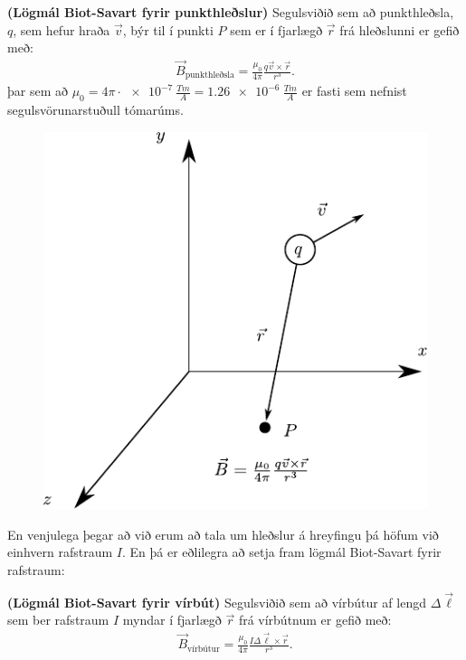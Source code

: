 \ifdefined \wholebook \else\documentclass[oneside]{book}\usepackage{EdlBook}\graphicspath{{figures/}}
\begin{document}
\begin{tcolorbox}
\begin{theorem}
\textbf{(Lögmál Biot-Savart fyrir punkthleðslur)} Segulsviðið sem að punkthleðsla, $q$, sem hefur hraða $\Vec{v}$, býr til í punkti $P$ sem er í fjarlægð $\Vec{r}$ frá hleðslunni er gefið með:
\begin{align*}
    \Vec{B}_{\text{punkthleðsla}} = \frac{\mu_0}{4\pi} \frac{q\Vec{v} \times \Vec{r}}{r^3}.
\end{align*}
þar sem að $\mu_0 = 4\pi  \cdot \SI{e-7}{\frac{Tm}{A}} = \SI{1.26e-6}{\frac{Tm}{A}}$ er fasti sem nefnist segulsvörunarstuðull tómarúms.
\end{theorem}
\end{tcolorbox}
\begin{figure}[H]
    \centering
    \includegraphics[scale = 1]{figures/segulsvidid.pdf}
\end{figure}
En venjulega þegar að við erum að tala um hleðslur á hreyfingu þá höfum við einhvern rafstraum $I$. En þá er eðlilegra að setja fram lögmál Biot-Savart fyrir rafstraum:
\begin{tcolorbox}
\begin{theorem}
\textbf{(Lögmál Biot-Savart fyrir vírbút)} Segulsviðið sem að vírbútur af lengd $\Delta \vec{\ell}$ sem ber rafstraum $I$ myndar í fjarlægð $\vec{r}$ frá vírbútnum er gefið með:
\begin{align*}
    \Vec{B}_{\text{vírbútur}} = \frac{\mu_0}{4\pi} \frac{I\Delta \Vec{\ell} \times \Vec{r}}{r^3}.
\end{align*}
\end{theorem}
\end{tcolorbox}
\end{document}
